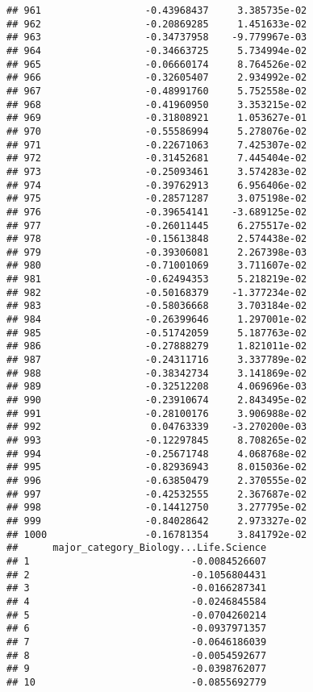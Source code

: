 \documentclass[
]{article}
\begin{document}
\begin{verbatim}
## 961                  -0.43968437     3.385735e-02
## 962                  -0.20869285     1.451633e-02
## 963                  -0.34737958    -9.779967e-03
## 964                  -0.34663725     5.734994e-02
## 965                  -0.06660174     8.764526e-02
## 966                  -0.32605407     2.934992e-02
## 967                  -0.48991760     5.752558e-02
## 968                  -0.41960950     3.353215e-02
## 969                  -0.31808921     1.053627e-01
## 970                  -0.55586994     5.278076e-02
## 971                  -0.22671063     7.425307e-02
## 972                  -0.31452681     7.445404e-02
## 973                  -0.25093461     3.574283e-02
## 974                  -0.39762913     6.956406e-02
## 975                  -0.28571287     3.075198e-02
## 976                  -0.39654141    -3.689125e-02
## 977                  -0.26011445     6.275517e-02
## 978                  -0.15613848     2.574438e-02
## 979                  -0.39306081     2.267398e-03
## 980                  -0.71001069     3.711607e-02
## 981                  -0.62494353     5.218219e-02
## 982                  -0.50168379    -1.377234e-02
## 983                  -0.58036668     3.703184e-02
## 984                  -0.26399646     1.297001e-02
## 985                  -0.51742059     5.187763e-02
## 986                  -0.27888279     1.821011e-02
## 987                  -0.24311716     3.337789e-02
## 988                  -0.38342734     3.141869e-02
## 989                  -0.32512208     4.069696e-03
## 990                  -0.23910674     2.843495e-02
## 991                  -0.28100176     3.906988e-02
## 992                   0.04763339    -3.270200e-03
## 993                  -0.12297845     8.708265e-02
## 994                  -0.25671748     4.068768e-02
## 995                  -0.82936943     8.015036e-02
## 996                  -0.63850479     2.370555e-02
## 997                  -0.42532555     2.367687e-02
## 998                  -0.14412750     3.277795e-02
## 999                  -0.84028642     2.973327e-02
## 1000                 -0.16781354     3.841792e-02
##      major_category_Biology...Life.Science
## 1                            -0.0084526607
## 2                            -0.1056804431
## 3                            -0.0166287341
## 4                            -0.0246845584
## 5                            -0.0704260214
## 6                            -0.0937971357
## 7                            -0.0646186039
## 8                            -0.0054592677
## 9                            -0.0398762077
## 10                           -0.0855692779

\end{verbatim}
\end{document}
